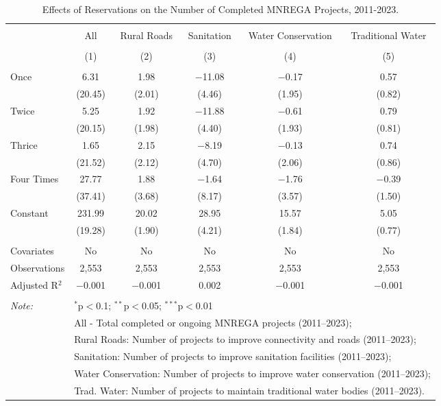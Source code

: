 
\begin{table}[!htbp] \centering 
  \caption{Effects of Reservations on the Number of Completed MNREGA Projects, 2011-2023.} 
  \label{main_mnrega_2011_2023_dosage} 
\begin{tabular}{@{\extracolsep{5pt}}lccccc} 
\\[-1.8ex]\hline 
\hline \\[-1.8ex] 
 & All & Rural Roads & Sanitation & Water Conservation & Traditional Water \\ 
\\[-1.8ex] & (1) & (2) & (3) & (4) & (5)\\ 
\hline \\[-1.8ex] 
 Once & 6.31 & 1.98 & $-$11.08 & $-$0.17 & 0.57 \\ 
  & (20.45) & (2.01) & (4.46) & (1.95) & (0.82) \\ 
  Twice & 5.25 & 1.92 & $-$11.88 & $-$0.61 & 0.79 \\ 
  & (20.15) & (1.98) & (4.40) & (1.93) & (0.81) \\ 
  Thrice & 1.65 & 2.15 & $-$8.19 & $-$0.13 & 0.74 \\ 
  & (21.52) & (2.12) & (4.70) & (2.06) & (0.86) \\ 
  Four Times & 27.77 & 1.88 & $-$1.64 & $-$1.76 & $-$0.39 \\ 
  & (37.41) & (3.68) & (8.17) & (3.57) & (1.50) \\ 
  Constant & 231.99 & 20.02 & 28.95 & 15.57 & 5.05 \\ 
  & (19.28) & (1.90) & (4.21) & (1.84) & (0.77) \\ 
 \hline \\[-1.8ex] 
Covariates & No & No & No & No & No \\ 
Observations & 2,553 & 2,553 & 2,553 & 2,553 & 2,553 \\ 
Adjusted R$^{2}$ & $-$0.001 & $-$0.001 & 0.002 & $-$0.001 & $-$0.001 \\ 
\hline 
\hline \\[-1.8ex] 
\textit{Note:}  & \multicolumn{5}{l}{$^{*}$p$<$0.1; $^{**}$p$<$0.05; $^{***}$p$<$0.01} \\ 
 & \multicolumn{5}{l}{All - Total completed or ongoing MNREGA projects (2011--2023);} \\ 
 & \multicolumn{5}{l}{Rural Roads: Number of projects to improve connectivity and roads (2011--2023);} \\ 
 & \multicolumn{5}{l}{Sanitation:  Number of projects to improve sanitation facilities  (2011--2023);} \\ 
 & \multicolumn{5}{l}{Water Conservation: Number of projects to improve water conservation (2011--2023);} \\ 
 & \multicolumn{5}{l}{Trad. Water: Number of projects to maintain traditional water bodies (2011--2023).} \\ 
\end{tabular} 
\end{table} 
